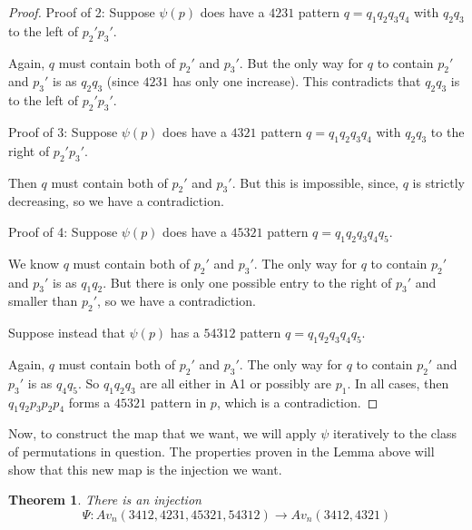 \documentclass[11pt]{amsart}
\newtheorem{theorem}{Theorem}[section]								\newtheorem{proposition}[theorem]{Proposition}
\theoremstyle{remark}
\numberwithin{equation}{section}
\begin{document}
\begin{proof}
    \vspace{10pt}

    Proof of 2:
    Suppose $\psi(p)$ does have a $4231$ pattern $q = q_1q_2q_3q_4$ with $q_2q_3$ to the left of $p_2'p_3'$.

    Again, $q$ must contain both of $p_2'$ and $p_3'$. But the only way for $q$ to contain $p_2'$ and $p_3'$ is as $q_2q_3$ (since $4231$ has only one increase). This contradicts that $q_2q_3$ is to the left of $p_2'p_3'$.


    \vspace{10pt}

    Proof of 3:
    Suppose $\psi(p)$ does have a $4321$ pattern $q=q_1q_2q_3q_4$ with $q_2q_3$ to the right of $p_2'p_3'$. 

    Then $q$ must contain both of $p_2'$ and $p_3'$. But this is impossible, since, $q$ is strictly decreasing, so we have a contradiction.
    
    \vspace{10pt}

    Proof of 4:
    Suppose $\psi(p)$ does have a $45321$ pattern $q = q_1q_2q_3q_4q_5$.


    We know $q$ must contain both of $p_2'$ and $p_3'$. The only way for $q$ to contain $p_2'$ and $p_3'$ is as $q_1q_2$. But there is only one possible entry to the right of $p_3'$ and smaller than $p_2'$, so we have a contradiction.

    Suppose instead that $\psi(p)$ has a $54312$ pattern $q=  q_1q_2q_3q_4q_5$.


    Again, $q$ must contain both of $p_2'$ and $p_3'$. The only way for $q$ to contain $p_2'$ and $p_3'$ is as $q_4q_5$. So $q_1q_2q_3$ are all either in A1 or possibly are $p_1$. In all cases, then $q_1q_2p_3p_2p_4$ forms a $45321$ pattern in $p$, which is a contradiction.
    


    
    
\end{proof}

Now, to construct the map that we want, we will apply $\psi$ iteratively to the class of permutations in question. The properties proven in the Lemma above will show that this new map is the injection we want.

\begin{theorem}
    There is an injection 
    \[
    \Psi: Av_n(3412,4231,45321,54312) \rightarrow Av_n(3412,4321)
    \]
\end{theorem}
\end{document}
